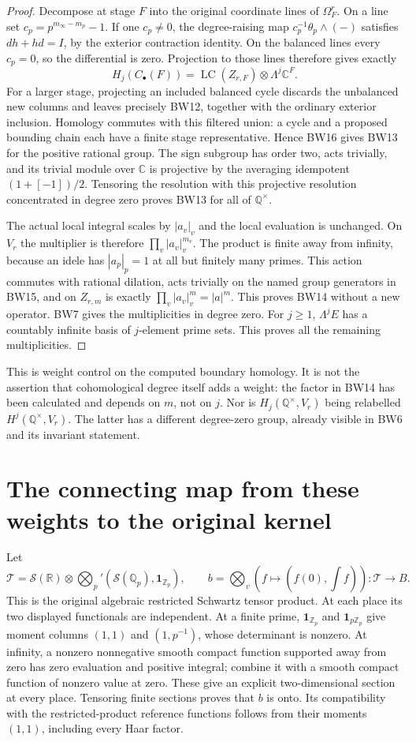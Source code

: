 \documentclass[11pt]{article}
\newcommand{\C}{\mathbb C}
\newcommand{\Q}{\mathbb Q}
\newcommand{\R}{\mathbb R}
\newcommand{\Z}{\mathbb Z}
\newcommand{\LC}{\operatorname{LC}}
\begin{document}
\begin{proof}
Decompose at stage $F$ into the original coordinate lines of
$\Omega_F^r$. On a line set $c_p=p^{m_\infty-m_p}-1$.
If one $c_p\ne0$, the degree-raising map
$c_p^{-1}\theta_p\wedge(-)$ satisfies $dh+hd=I$, by the
exterior contraction identity. On the balanced lines every $c_p=0$,
so the differential is zero. Projection to those lines therefore
gives exactly
\[
 H_j(C_\bullet(F))=\LC(Z_{r,F})\otimes\Lambda^j\C^F.
 \tag{BW16}
\]
For a larger stage, projecting an included balanced cycle discards
the unbalanced new columns and leaves precisely BW12, together
with the ordinary exterior inclusion. Homology commutes with this
filtered union: a cycle and a proposed bounding chain each have a
finite stage representative. Hence BW16 gives BW13 for the positive
rational group. The sign subgroup has order two, acts trivially,
and its trivial module over $\C$ is projective by the averaging
idempotent $(1+[-1])/2$. Tensoring the resolution with this
projective resolution concentrated in degree zero proves BW13 for
all of $\Q^\times$.

The actual local integral scales by $|a_v|_v$ and the local
evaluation is unchanged. On $V_r$ the multiplier is therefore
$\prod_v|a_v|_v^{m_v}$. The product is finite away from infinity,
because an idele has $|a_p|_p=1$ at all but finitely many primes.
This action commutes with rational dilation, acts trivially on the
named group generators in BW15, and on $Z_{r,m}$ is exactly
$\prod_v|a_v|_v^m=|a|^m$. This proves BW14 without a new operator.
BW7 gives the multiplicities in degree zero. For $j\ge1$,
$\Lambda^jE$ has a countably infinite basis of $j$-element prime
sets. This proves all the remaining multiplicities.
\end{proof}

This is weight control on the computed boundary homology. It is
not the assertion that cohomological degree itself adds a weight:
the factor in BW14 has been calculated and depends on $m$, not on
$j$. Nor is $H_j(\Q^\times,V_r)$ being relabelled
$H^j(\Q^\times,V_r)$. The latter has a different degree-zero group,
already visible in BW6 and its invariant statement.

\section{The connecting map from these weights to the original kernel}
Let
\[
 \mathcal T=\mathcal S(\R)\otimes
       \bigotimes_p'(\mathcal S(\Q_p),\mathbf1_{\Z_p}),
 \qquad b=\bigotimes_v(f\mapsto(f(0),\int f)):\mathcal T\to B.
 \tag{BW17}
\]
This is the original algebraic restricted Schwartz tensor product.
At each place its two displayed functionals are independent. At a
finite prime, $\mathbf1_{\Z_p}$ and $\mathbf1_{p\Z_p}$ give moment
columns $(1,1)$ and $(1,p^{-1})$, whose determinant is nonzero.
At infinity, a nonzero nonnegative smooth compact function supported
away from zero has zero evaluation and positive integral; combine
it with a smooth compact function of nonzero value at zero. These
give an explicit two-dimensional section at every place. Tensoring
finite sections proves that $b$ is onto. Its compatibility with the
restricted-product reference functions follows from their moments
$(1,1)$, including every Haar factor.
\end{document}
